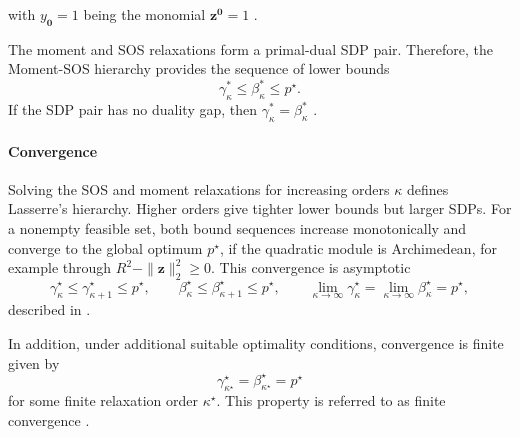 with \(y_{\bm{0}}=1\) being the monomial
\(\bm{z}^{\bm{0}}=1\) \cite{Yang2024Semidefinite}. 

The moment and SOS relaxations
form a primal-dual SDP pair. Therefore, the Moment-SOS hierarchy provides the sequence of lower bounds
\begin{equation}
\gamma_{\kappa}^{*}
\leq
\beta_{\kappa}^{*}
\leq
p^\star.
\label{eq:moment_sos_bounds_comparison}
\end{equation}
If the SDP pair has no duality gap, then $\gamma_{\kappa}^{*} = \beta_{\kappa}^{*}$ 
\cite{Lasserre2001Global}.

\paragraph{Convergence}
Solving the SOS and moment relaxations for increasing orders \(\kappa\) defines
Lasserre's hierarchy. Higher orders give tighter lower bounds but larger SDPs.
For a nonempty feasible set, both bound sequences increase monotonically and
converge to the global optimum \(p^\star\), 
if the quadratic module is Archimedean, for example through
\(R^2-\|\bm{z}\|_2^2\geq0\). This convergence is asymptotic 
\begin{equation}
\gamma_{\kappa}^{\star}\leq\gamma_{\kappa+1}^{\star}\leq p^\star,
\qquad
\beta_{\kappa}^{\star}\leq\beta_{\kappa+1}^{\star}\leq p^\star,
\qquad
\lim_{\kappa\rightarrow\infty}\gamma_\kappa^\star
=
\lim_{\kappa\rightarrow\infty}\beta_\kappa^\star
=
p^\star,
\label{eq:convergence_of_moment_sos_hierarchy}
\end{equation}
described in \cite{Lasserre2001Global}.

In addition, under additional suitable optimality conditions, convergence is finite given by
\begin{equation}
\gamma_{\kappa^\star}^\star
=
\beta_{\kappa^\star}^\star
=
p^\star
\end{equation}
for some finite relaxation order \(\kappa^\star\).
This property is referred to as finite convergence \cite{Nie2014FiniteConvergence,Lasserre2001Global}.

